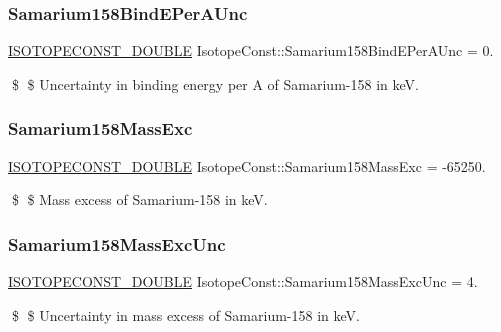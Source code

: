 \subsubsection{\texorpdfstring{Samarium158\+Bind\+E\+Per\+A\+Unc}{Samarium158BindEPerAUnc}}
{\footnotesize\ttfamily \mbox{\hyperlink{group___isotope_const-_macros_ga8f45a7272ce02c0b4c65c44636ed719a}{I\+S\+O\+T\+O\+P\+E\+C\+O\+N\+S\+T\+\_\+\+D\+O\+U\+B\+LE}} Isotope\+Const\+::\+Samarium158\+Bind\+E\+Per\+A\+Unc = 0.}

\$ \$ Uncertainty in binding energy per A of Samarium-\/158 in keV. \mbox{\label{group___isotope_const-_samarium-_sm158_gae204282328050c73d0fd821b10f55c15}} 
\subsubsection{\texorpdfstring{Samarium158\+Mass\+Exc}{Samarium158MassExc}}
{\footnotesize\ttfamily \mbox{\hyperlink{group___isotope_const-_macros_ga8f45a7272ce02c0b4c65c44636ed719a}{I\+S\+O\+T\+O\+P\+E\+C\+O\+N\+S\+T\+\_\+\+D\+O\+U\+B\+LE}} Isotope\+Const\+::\+Samarium158\+Mass\+Exc = -\/65250.}

\$ \$ Mass excess of Samarium-\/158 in keV. \mbox{\label{group___isotope_const-_samarium-_sm158_ga5c5c23517a94669669cee2908171fbe8}} 
\subsubsection{\texorpdfstring{Samarium158\+Mass\+Exc\+Unc}{Samarium158MassExcUnc}}
{\footnotesize\ttfamily \mbox{\hyperlink{group___isotope_const-_macros_ga8f45a7272ce02c0b4c65c44636ed719a}{I\+S\+O\+T\+O\+P\+E\+C\+O\+N\+S\+T\+\_\+\+D\+O\+U\+B\+LE}} Isotope\+Const\+::\+Samarium158\+Mass\+Exc\+Unc = 4.}

\$ \$ Uncertainty in mass excess of Samarium-\/158 in keV. \mbox{\label{group___isotope_const-_samarium-_sm158_gabf15fe8258e95c0a20aa92897610ac8d}} 
